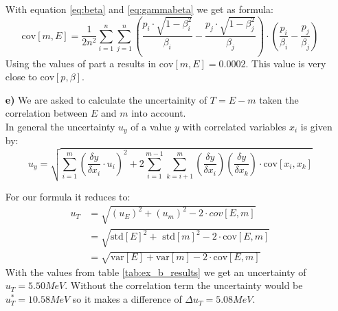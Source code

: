\documentclass[10pt]{article}
\newenvironment{myfont}{\fontfamily{put}\selectfont}{\par}
\begin{document}
\begin{myfont}
\begin{itemize}
   With equation \ref{eq:beta} and \ref{eq:gammabeta} we get as formula:
   \begin{equation}
   \textrm{cov}[m, E] = \frac{1}{2n^2} \sum_{i=1}^n \sum_{j=1}^n \left(\frac{p_i \cdot \sqrt{1- \beta_i^2}}{\beta_i} -  \frac{p_j \cdot \sqrt{1- \beta_j^2}}{\beta_j}\right) \cdot \left(\frac{p_i}{\beta_i} - \frac{p_j}{\beta_j} \right)
   \end{equation}
   Using the values of part a results in $\textrm{cov}[m, E] = 0.0002 $. This value is very close to $\textrm{cov}[p, \beta]$.


  \item[\textbf{e)}] \label{part_e}
    We are asked to calculate the uncertainity of $T = E - m$ taken the correlation between $E$ and $m$ into account. \\
    In general the uncertainty $u_y$ of a value $y$ with correlated variables $x_i$ is given by:
   \begin{equation}
    u_y = \sqrt{\sum_{i=1}^m  \left(\frac{\delta y}{\delta x_i} \cdot u_i\right)^2 + 2 \sum_{i=1}^{m-1} \sum_{k=i+1}^{m}  \left(\frac{\delta y}{\delta x_i}\right)  \left(\frac{\delta y}{\delta x_k}\right) \cdot \textrm{cov}[x_i, x_k]}
   \end{equation}

   For our formula it reduces to:
  \begin{align}
    u_T &= \sqrt{ (u_E)^2 + (u_m)^2 - 2 \cdot cov[E, m]} \\
           &= \sqrt{ \textrm{std}[E]^2 +\textrm{ std}[m]^2 - 2 \cdot \textrm{cov}[E, m]} \\
           &= \sqrt{\textrm{var}[E] + \textrm{var}[m] - 2 \cdot \textrm{cov}[E, m]}
   \end{align}
  With the values from table \ref{tab:ex_b_results} we get an uncertainty of $u_T = 5.50 MeV$. Without the correlation term the uncertainty would be $u_T^* = 10.58 MeV$ so it makes a difference of $\Delta u_T = 5.08 MeV$.

\end{itemize}

\end{myfont}
\end{document}
